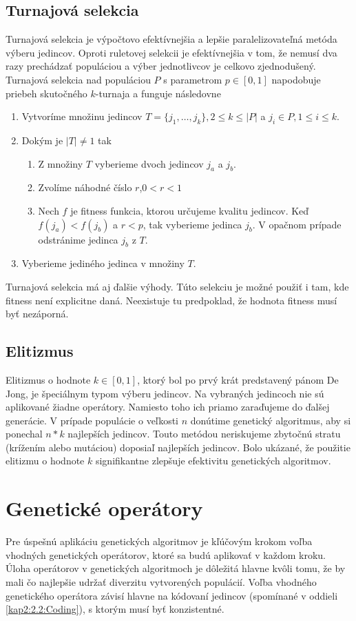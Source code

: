 \subsection{Turnajová selekcia}\label{kap2:2.4:2.4.2:Tournament}
Turnajová selekcia je výpočtovo efektívnejšia a lepšie paralelizovateľná metóda výberu jedincov. Oproti ruletovej selekcii je efektívnejšia v tom, že nemusí dva razy prechádzať populáciou a výber jednotlivcov je celkovo zjednodušený. Turnajová selekcia nad populáciou $P$ s parametrom $p \in [0,1]$ napodobuje priebeh skutočného $k$-turnaja a funguje následovne
\begin{enumerate}
\item Vytvoríme množinu jedincov $T = \{j_1,\ldots,j_k\}, 2 \leq k \leq \lvert P \lvert$ a $j_i \in P, 1 \leq i \leq k$.
\item Dokým je $\lvert T \rvert \ne 1$ tak
\begin{enumerate}
\item Z množiny $T$ vyberieme dvoch jedincov $j_a$ a $j_b$. 
\item Zvolíme náhodné číslo $r$,$0 < r < 1$
\item Nech $f$ je fitness funkcia, ktorou určujeme kvalitu jedincov. Keď $f(j_a) < f(j_b)$  a $r < p$, tak vyberieme jedinca $j_b$. V opačnom prípade odstránime jedinca $j_b$ z $T$.
\end{enumerate}
\item Vyberieme jediného jedinca v množiny $T$. 
\end{enumerate} 
Turnajová selekcia má aj ďalšie výhody.
Túto selekciu je možné použiť i tam, kde fitness není explicitne daná. Neexistuje tu predpoklad, že hodnota fitness musí byť nezáporná.

\subsection{Elitizmus}\label{kap2:2.4:2.4.3:Elitism}
Elitizmus o hodnote $k\in[0,1]$, ktorý bol po prvý krát predstavený pánom De Jong, je špeciálnym typom výberu jedincov. Na vybraných jedincoch nie sú aplikované žiadne operátory. Namiesto toho ich priamo zaraďujeme do ďalšej generácie. V prípade populácie o veľkosti $n$ donútime genetický algoritmus, aby si ponechal $n*k$ najlepších jedincov. Touto metódou neriskujeme zbytočnú stratu (krížením alebo mutáciou) doposiaľ najlepších jedincov. Bolo ukázané, že použitie elitizmu o hodnote $k$ signifikantne zlepšuje efektivitu genetických algoritmov.

\section{Genetické operátory}\label{kap2:2.5:Operators}
Pre úspešnú aplikáciu genetických algoritmov je kľúčovým krokom voľba vhodných genetických operátorov, ktoré sa budú aplikovať v každom kroku. Úloha operátorov v genetických algoritmoch je dôležitá hlavne kvôli tomu, že by mali čo najlepšie udržať diverzitu vytvorených populácií. Voľba vhodného genetického operátora závisí hlavne na kódovaní jedincov (spomínané v oddieli \ref{kap2:2.2:Coding}), s ktorým musí byť konzistentné.

